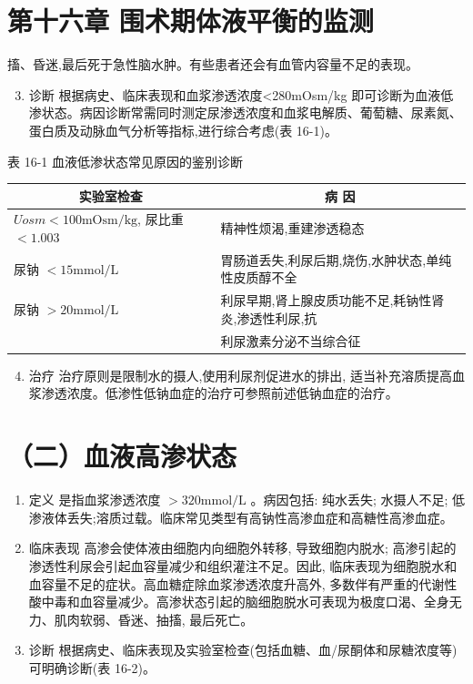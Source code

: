 \documentclass[10pt]{article}
\begin{document}
\section*{第十六章 围术期体液平衡的监测}
搐、昏迷,最后死于急性脑水肿。有些患者还会有血管内容量不足的表现。

\begin{enumerate}
  \setcounter{enumi}{2}
  \item 诊断 根据病史、临床表现和血浆渗透浓度<280mOsm/kg 即可诊断为血液低渗状态。病因诊断常需同时测定尿渗透浓度和血浆电解质、葡萄糖、尿素氮、蛋白质及动脉血气分析等指标,进行综合考虑(表 16-1)。
\end{enumerate}

表 16-1 血液低渗状态常见原因的鉴别诊断

\begin{center}
\begin{tabular}{ll}
\hline
\multicolumn{1}{c}{实验室检查} & \multicolumn{1}{c}{病 因} \\
\hline
$U o s m<100 \mathrm{mOsm} / \mathrm{kg}$, 尿比重 $<1.003$ & 精神性烦渴,重建渗透稳态 \\
尿钠 $<15 \mathrm{mmol} / \mathrm{L}$ & 胃肠道丢失,利尿后期,烧伤,水肿状态,单纯性皮质醇不全 \\
尿钠 $>20 \mathrm{mmol} / \mathrm{L}$ & 利尿早期,肾上腺皮质功能不足,耗钠性肾炎,渗透性利尿,抗 \\
 & 利尿激素分泌不当综合征 \\
\hline
\end{tabular}
\end{center}

\begin{enumerate}
  \setcounter{enumi}{3}
  \item 治疗 治疗原则是限制水的摄人,使用利尿剂促进水的排出, 适当补充溶质提高血浆渗透浓度。低渗性低钠血症的治疗可参照前述低钠血症的治疗。
\end{enumerate}

\section*{（二）血液高渗状态}
\begin{enumerate}
  \item 定义 是指血浆渗透浓度 $>320 \mathrm{mmol} / \mathrm{L}$ 。病因包括: 纯水丢失; 水摄人不足; 低渗液体丢失;溶质过载。临床常见类型有高钠性高渗血症和高糖性高渗血症。

  \item 临床表现 高渗会使体液由细胞内向细胞外转移, 导致细胞内脱水; 高渗引起的渗透性利尿会引起血容量减少和组织灌注不足。因此, 临床表现为细胞脱水和血容量不足的症状。高血糖症除血浆渗透浓度升高外, 多数伴有严重的代谢性酸中毒和血容量减少。高渗状态引起的脑细胞脱水可表现为极度口渴、全身无力、肌肉软弱、昏迷、抽搐, 最后死亡。

  \item 诊断 根据病史、临床表现及实验室检查(包括血糖、血/尿酮体和尿糖浓度等)可明确诊断(表 16-2)。

\end{enumerate}
\end{document}
